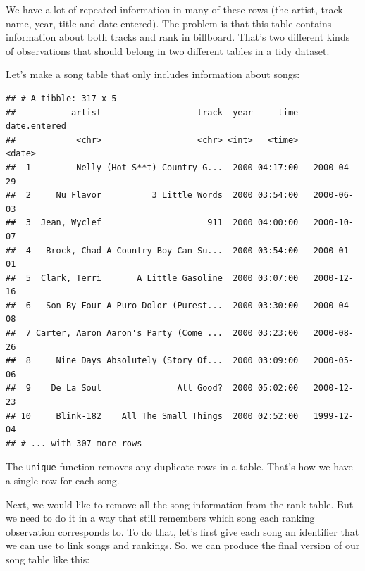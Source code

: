 \documentclass[12pt,]{book}
\newenvironment{Shaded}{\begin{snugshade}}{\end{snugshade}}
\newcommand{\KeywordTok}[1]{\textcolor[rgb]{0.13,0.29,0.53}{\textbf{#1}}}
\newcommand{\DataTypeTok}[1]{\textcolor[rgb]{0.13,0.29,0.53}{#1}}
\newcommand{\StringTok}[1]{\textcolor[rgb]{0.31,0.60,0.02}{#1}}
\newcommand{\OperatorTok}[1]{\textcolor[rgb]{0.81,0.36,0.00}{\textbf{#1}}}
\newcommand{\NormalTok}[1]{#1}
\theoremstyle{definition}
\theoremstyle{definition}
\theoremstyle{remark}
\begin{document}
We have a lot of repeated information in many of these rows (the artist,
track name, year, title and date entered). The problem is that this
table contains information about both tracks and rank in billboard.
That's two different kinds of observations that should belong in two
different tables in a tidy dataset.

Let's make a song table that only includes information about songs:

\begin{Shaded}
\end{Shaded}

\begin{verbatim}
## # A tibble: 317 x 5
##           artist                   track  year     time date.entered
##            <chr>                   <chr> <int>   <time>       <date>
##  1         Nelly (Hot S**t) Country G...  2000 04:17:00   2000-04-29
##  2     Nu Flavor          3 Little Words  2000 03:54:00   2000-06-03
##  3  Jean, Wyclef                     911  2000 04:00:00   2000-10-07
##  4   Brock, Chad A Country Boy Can Su...  2000 03:54:00   2000-01-01
##  5  Clark, Terri       A Little Gasoline  2000 03:07:00   2000-12-16
##  6   Son By Four A Puro Dolor (Purest...  2000 03:30:00   2000-04-08
##  7 Carter, Aaron Aaron's Party (Come ...  2000 03:23:00   2000-08-26
##  8     Nine Days Absolutely (Story Of...  2000 03:09:00   2000-05-06
##  9    De La Soul               All Good?  2000 05:02:00   2000-12-23
## 10     Blink-182    All The Small Things  2000 02:52:00   1999-12-04
## # ... with 307 more rows
\end{verbatim}

The \texttt{unique} function removes any duplicate rows in a table.
That's how we have a single row for each song.

Next, we would like to remove all the song information from the rank
table. But we need to do it in a way that still remembers which song
each ranking observation corresponds to. To do that, let's first give
each song an identifier that we can use to link songs and rankings. So,
we can produce the final version of our song table like this:

\begin{Shaded}
\end{Shaded}
\end{document}
